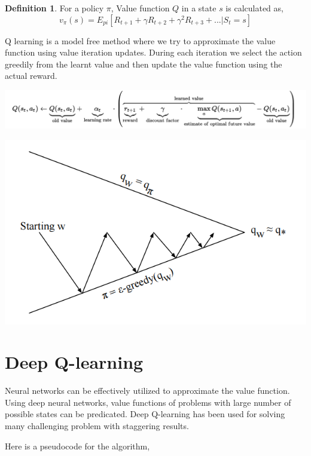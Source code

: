 \documentclass[12pt]{extreport}
\theoremstyle{plain}
\theoremstyle{definition}
\newtheorem{defn}[thm]{Definition} %
\begin{document}
\begin{defn}
For a policy $ \pi $, Value function $ Q $ in a state $ s $ is calculated as,
$$ v_{\pi}(s) = E_{pi}[R_{t+1} + \gamma R_{t+2} + \gamma^2 R_{t+3} + ... | S_t = s] $$
\end{defn}

Q learning is a model free method where we try to approximate the value function
using value iteration updates. During each iteration we select the action greedily
from the learnt value and then update the value function using the actual reward.

\begin{center}
    \includegraphics[width=\linewidth]{q0.png}
\end{center}

\begin{center}
    \includegraphics[width=0.8\linewidth]{q1.png}
\end{center}

\section{Deep Q-learning}

Neural networks can be effectively utilized to approximate the value function.
Using deep neural networks, value functions of problems with large number of
possible states can be predicated. Deep Q-learning has been used for solving
many challenging problem with staggering results.

Here is a pseudocode for the algorithm,
\end{document}
